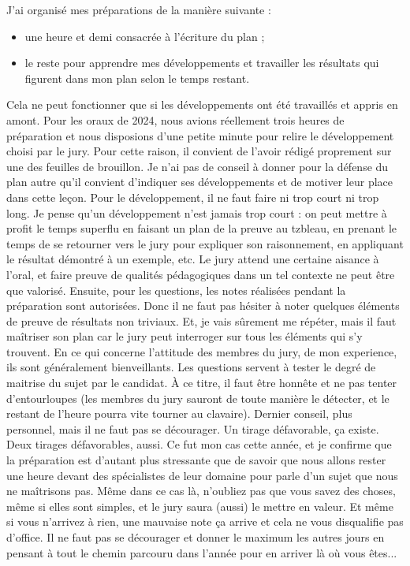   J'ai organisé mes préparations de la manière suivante :
  \begin{itemize}
    \item une heure et demi consacrée à l'écriture du plan ;
    \item le reste pour apprendre mes développements et travailler les résultats qui figurent dans mon plan selon le temps restant.
  \end{itemize}
  Cela ne peut fonctionner que si les développements ont été travaillés et appris en amont. Pour les oraux de 2024, nous avions réellement trois heures de préparation et nous disposions d'une petite minute pour relire le développement choisi par le jury. Pour cette raison, il convient de l'avoir rédigé proprement sur une des feuilles de brouillon.
  \newpar
  Je n'ai pas de conseil à donner pour la défense du plan autre qu'il convient d'indiquer ses développements et de motiver leur place dans cette leçon.
  \newpar
  Pour le développement, il ne faut faire ni trop court ni trop long. Je pense qu'un développement n'est jamais trop court : on peut mettre à profit le temps superflu en faisant un plan de la preuve au tzbleau, en prenant le temps de se retourner vers le jury pour expliquer son raisonnement, en appliquant le résultat démontré à un exemple, etc. Le jury attend une certaine aisance à l'oral, et faire preuve de qualités pédagogiques dans un tel contexte ne peut être que valorisé.
  \newpar
  Ensuite, pour les questions, les notes réalisées pendant la préparation sont autorisées. Donc il ne faut pas hésiter à noter quelques éléments de preuve de résultats non triviaux. Et, je vais sûrement me répéter, mais il faut maîtriser son plan car le jury peut interroger sur tous les éléments qui s'y trouvent.
  \newpar
  En ce qui concerne l'attitude des membres du jury, de mon experience, ils sont généralement bienveillants. Les questions servent à tester le degré de maitrise du sujet par le candidat. À ce titre, il faut être honnête et ne pas tenter d'entourloupes (les membres du jury sauront de toute manière le détecter, et le restant de l'heure pourra vite tourner au clavaire).
  \newpar
  Dernier conseil, plus personnel, mais il ne faut pas se décourager. Un tirage défavorable, ça existe. Deux tirages défavorables, aussi. Ce fut mon cas cette année, et je confirme que la préparation est d'autant plus stressante que de savoir que nous allons rester une heure devant des spécialistes de leur domaine pour parle d'un sujet que nous ne maîtrisons pas. Même dans ce cas là, n'oubliez pas que vous savez des choses, même si elles sont simples, et le jury saura (aussi) le mettre en valeur. Et même si vous n'arrivez à rien, une mauvaise note ça arrive et cela ne vous disqualifie pas d'office. Il ne faut pas se décourager et donner le maximum les autres jours en pensant à tout le chemin parcouru dans l'année pour en arriver là où vous êtes...

